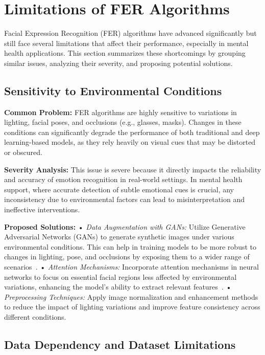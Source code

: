 \documentclass[lettersize,journal]{IEEEtran}
\begin{document}
\section{Limitations of FER Algorithms}
\label{sec:limitations}

Facial Expression Recognition (FER) algorithms have advanced significantly but still face several limitations that affect their performance, especially in mental health applications. This section summarizes these shortcomings by grouping similar issues, analyzing their severity, and proposing potential solutions.

\subsection{Sensitivity to Environmental Conditions}

\textbf{Common Problem:} FER algorithms are highly sensitive to variations in lighting, facial poses, and occlusions (e.g., glasses, masks). Changes in these conditions can significantly degrade the performance of both traditional and deep learning-based models, as they rely heavily on visual cues that may be distorted or obscured.

\textbf{Severity Analysis:} This issue is severe because it directly impacts the reliability and accuracy of emotion recognition in real-world settings. In mental health support, where accurate detection of subtle emotional cues is crucial, any inconsistency due to environmental factors can lead to misinterpretation and ineffective interventions.

\textbf{Proposed Solutions:}
	•	\emph{Data Augmentation with GANs:} Utilize Generative Adversarial Networks (GANs) to generate synthetic images under various environmental conditions. This can help in training models to be more robust to changes in lighting, pose, and occlusions by exposing them to a wider range of scenarios~\cite{Akhand2021}.
	•	\emph{Attention Mechanisms:} Incorporate attention mechanisms in neural networks to focus on essential facial regions less affected by environmental variations, enhancing the model’s ability to extract relevant features~\cite{Li2019}.
	•	\emph{Preprocessing Techniques:} Apply image normalization and enhancement methods to reduce the impact of lighting variations and improve feature consistency across different conditions.

\subsection{Data Dependency and Dataset Limitations}
\end{document}
